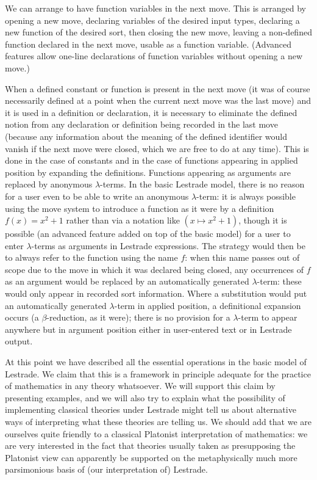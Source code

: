 \documentclass{article}
\begin{document}
We can arrange to have function variables in the next move.  This is arranged by opening a new move, declaring variables of the desired input types,
declaring a new function of the desired sort, then closing the new move, leaving a non-defined function declared in the next move, usable as a function variable.  (Advanced features allow one-line declarations of function variables without opening a new move.)

When a defined constant or function is present in the next move (it was of course necessarily defined at a point when the current next move was the last move)
and it is used in a definition or declaration, it is necessary to eliminate the defined notion from any declaration or definition being recorded in the last move (because any information about the meaning of the defined identifier would vanish if the next move were closed, which we are free to do at any time).
This is done in the case of constants and in the case of functions appearing in applied position by expanding the definitions.  Functions appearing
as arguments are replaced by anonymous $\lambda$-terms.  In the basic Lestrade model, there is no reason for a user even to be able to write an anonymous $\lambda$-term:  it is always possible using the move system to introduce a function as it were by a definition $f(x)=x^2+1$ rather than via a notation
like $(x \mapsto x^2+1)$, though it is possible (an advanced feature added on top of the basic model) for a user to enter $\lambda$-terms as arguments in Lestrade expressions.  The strategy would then be to always refer to the function using the name $f$:  when this name passes out of scope due to the move in which it was declared being closed, any occurrences of $f$ as an argument would be replaced by an automatically generated $\lambda$-term:  these would only appear in recorded sort information.  Where a substitution would put an automatically generated $\lambda$-term in applied position, a definitional expansion occurs (a $\beta$-reduction, as it were);  there is no provision for a $\lambda$-term to appear anywhere but in argument position either in user-entered text or in Lestrade output.

At this point we have described all the essential operations in the basic model of Lestrade.  We claim that this is a framework in principle adequate for the practice of mathematics in any theory whatsoever.  We will support this claim by presenting examples, and we will also try to explain what the possibility of implementing classical theories under Lestrade might tell us about alternative ways of interpreting what these theories are telling us.  We should add that we are ourselves quite friendly to a classical Platonist interpretation of mathematics:  we are very interested in the fact that theories usually taken as presupposing the Platonist view  can apparently be supported on the metaphysically much more parsimonious basis of (our interpretation of) Lestrade.
\end{document}
